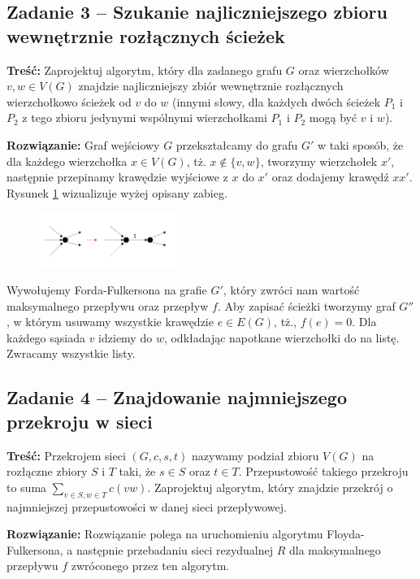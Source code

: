 \subsection{Zadanie 3 -- Szukanie najliczniejszego zbioru wewnętrznie rozłącznych
	ścieżek}
\textbf{Treść: } Zaprojektuj algorytm, który dla zadanego grafu $G$
oraz wierzchołków $v, w \in V(G)$ znajdzie najliczniejszy
zbiór wewnętrznie rozłącznych wierzchołkowo ścieżek od 
$v$ do $w$ (innymi słowy, dla każdych dwóch ścieżek $P_1$ i $P_2$ z
tego zbioru jedynymi wspólnymi wierzchołkami $P_1$ i $P_2$ 
mogą być $v$ i $w$).

\textbf{Rozwiązanie: }
Graf wejściowy $G$ przekształcamy do grafu $G'$ w taki sposób, że
dla każdego wierzchołka $x \in V(G)$, tż. $x \not \in \{v, w\}$,
tworzymy wierzchołek $x'$, 
następnie przepinamy krawędzie wyjściowe z $x$ do $x'$ oraz 
dodajemy krawędź $xx'$. Rysunek \ref{fig:zad43_fig} wizualizuje
wyżej opisany zabieg.

\begin{figure}[H]
	\centering
	\includegraphics[width=0.4\textwidth]{data/zad43.png}
	\caption{  }
	\label{fig:zad43_fig}
\end{figure}

Wywołujemy Forda-Fulkersona na grafie $G'$, który zwróci nam 
wartość maksymalnego przepływu oraz przepływ $f$. Aby zapisać ścieżki
tworzymy graf $G''$, w którym usuwamy wszystkie krawędzie $e \in E(G)$,
tż., $f(e) = 0$. Dla każdego sąsiada $v$ idziemy do $w$, odkładając
napotkane wierzchołki do na listę. Zwracamy wszystkie listy. 

\subsection{Zadanie 4 -- Znajdowanie najmniejszego przekroju w sieci}
\textbf{Treść: } Przekrojem sieci $(G, c, s, t)$ 
nazywamy podział zbioru $V(G)$ na 
rozłączne zbiory $S$ i $T$ taki, że $s \in S$
oraz $t \in T$. Przepustowość takiego przekroju to suma
$\sum_{v\in S,w\in T} c(vw)$.
Zaprojektuj algorytm, który znajdzie przekrój 
o najmniejszej przepustowości w danej sieci przepływowej.

\textbf{Rozwiązanie: }
Rozwiązanie polega na uruchomieniu algorytmu Floyda-Fulkersona, a
następnie przebadaniu sieci rezydualnej $R$ dla maksymalnego przepływu $f$
zwróconego przez ten algorytm.

